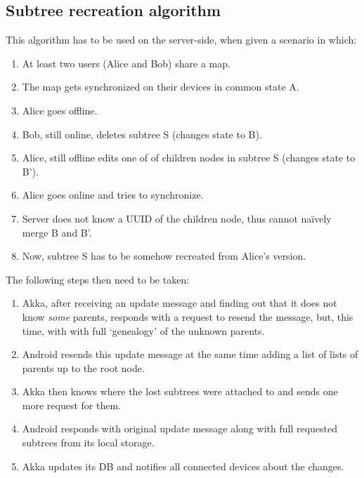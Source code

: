 %
%
%
%
%

\subsection{Subtree recreation algorithm}
\label{subsec:subtree-recreation}

This algorithm has to be used on the server-side, when given a scenario in which:

\begin{enumerate}
	\item At least two users (Alice and Bob) share a map.
	\item The map gets synchronized on their devices in common state A.
	\item Alice goes offline.
	\item Bob, still online, deletes subtree S (changes state to B).
	\item Alice, still offline edits one of of children nodes in subtree S (changes state to B').
	\item Alice goes online and tries to synchronize.
	\item Server does not know a UUID of the children node, thus cannot naïvely merge B and B'.
	\item Now, subtree S has to be somehow recreated from Alice's version.
\end{enumerate}

The following steps then need to be taken:

\begin{enumerate}
	\item Akka, after receiving an update message and finding out that it does not know \emph{some} parents, responds with a request to resend the message, but, this time, with with full `genealogy' of the unknown parents.
	\item Android resends this update message at the same time adding a list of lists of parents up to the root node.
	\item Akka then knows where the lost subtrees were attached to and sends one more request for them.
	\item Android responds with original update message along with full requested subtrees from its local storage.
	\item Akka updates its DB and notifies all connected devices about the changes.
\end{enumerate}
